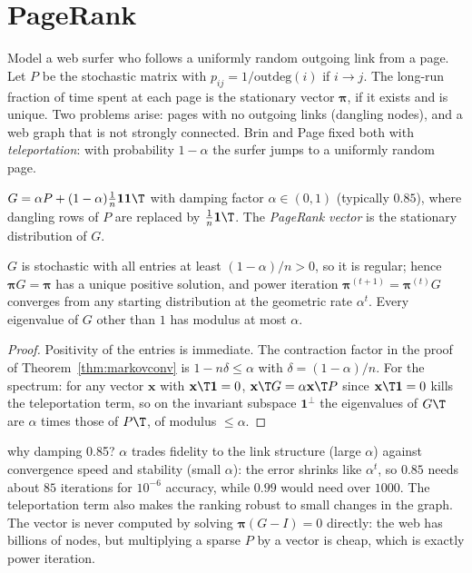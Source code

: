 \section{PageRank}

Model a web surfer who follows a uniformly random outgoing link from a page. Let $P$ be the stochastic matrix with $p_{ij}=1/\mathrm{outdeg}(i)$ if $i\to j$. The long-run fraction of time spent at each page is the stationary vector $\boldsymbol\pi$, if it exists and is unique. Two problems arise: pages with no outgoing links (dangling nodes), and a web graph that is not strongly connected. Brin and Page fixed both with \emph{teleportation}: with probability $1-\alpha$ the surfer jumps to a uniformly random page.

\begin{definition}
$G=\alpha P+(1-\alpha)\tfrac1n\mathbf{1}\mathbf{1}\T$ with damping factor $\alpha\in(0,1)$ (typically $0.85$), where dangling rows of $P$ are replaced by $\tfrac1n\mathbf{1}\T$. The \emph{PageRank vector} is the stationary distribution of $G$.
\end{definition}

\begin{theorem}\label{thm:pagerank}
$G$ is stochastic with all entries at least $(1-\alpha)/n>0$, so it is regular; hence $\boldsymbol\pi G=\boldsymbol\pi$ has a unique positive solution, and power iteration $\boldsymbol\pi^{(t+1)}=\boldsymbol\pi^{(t)}G$ converges from any starting distribution at the geometric rate $\alpha^t$. Every eigenvalue of $G$ other than $1$ has modulus at most $\alpha$.
\end{theorem}

\begin{proof}
Positivity of the entries is immediate. The contraction factor in the proof of Theorem~\ref{thm:markovconv} is $1-n\delta\le\alpha$ with $\delta=(1-\alpha)/n$. For the spectrum: for any vector $\mathbf{x}$ with $\mathbf{x}\T\mathbf{1}=0$, $\mathbf{x}\T G=\alpha\mathbf{x}\T P$ since $\mathbf{x}\T\mathbf{1}=0$ kills the teleportation term, so on the invariant subspace $\mathbf{1}^\perp$ the eigenvalues of $G\T$ are $\alpha$ times those of $P\T$, of modulus $\le\alpha$.
\end{proof}

\begin{interview}{why damping 0.85?}
$\alpha$ trades fidelity to the link structure (large $\alpha$) against convergence speed and stability (small $\alpha$): the error shrinks like $\alpha^t$, so $0.85$ needs about $85$ iterations for $10^{-6}$ accuracy, while $0.99$ would need over $1000$. The teleportation term also makes the ranking robust to small changes in the graph. The vector is never computed by solving $\boldsymbol\pi(G-I)=0$ directly: the web has billions of nodes, but multiplying a sparse $P$ by a vector is cheap, which is exactly power iteration.
\end{interview}

